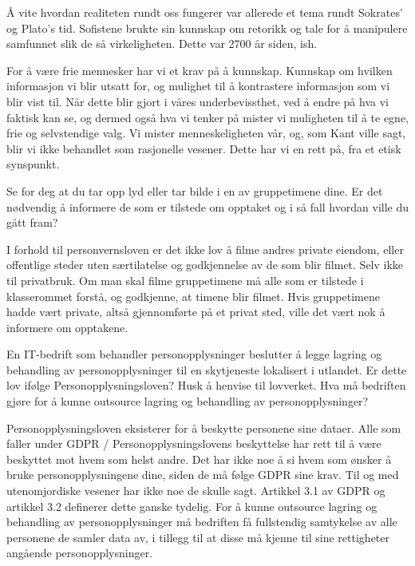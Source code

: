 \documentclass{../../myassignment}
\begin{document}
	\begin{answer}
		Å vite hvordan realiteten rundt oss fungerer var allerede et tema rundt Sokrates' og Plato's tid. Sofistene brukte sin kunnskap om retorikk og tale for å manipulere samfunnet slik de så virkeligheten. Dette var 2700 år siden, ish. 

		For å være frie mennesker har vi et krav på å kunnskap. Kunnskap om hvilken informasjon vi blir utsatt for, og mulighet til å kontrastere informasjon som vi blir vist til. Når dette blir gjort i våres underbevissthet, ved å endre på hva vi faktisk kan se, og dermed også hva vi tenker på mister vi muligheten til å te egne, frie og selvstendige valg. Vi mister menneskeligheten vår, og, som Kant ville sagt, blir vi ikke behandlet som rasjonelle vesener. Dette har vi en rett på, fra et etisk synspunkt.

	\end{answer}

	\begin{problem}
		Se for deg at du tar opp lyd eller tar bilde i en av gruppetimene dine. Er det nødvendig å informere de som er tilstede om opptaket og i så fall hvordan ville du gått fram?
	\end{problem}

	\begin{answer}
		I forhold til personvernsloven er det ikke lov å filme andres private eiendom, eller offentlige steder uten særtilatelse og godkjennelse av de som blir filmet. Selv ikke til privatbruk. Om man skal filme gruppetimene må alle som er tilstede i klasserommet forstå, og godkjenne, at timene blir filmet. Hvis gruppetimene hadde vært private, altså gjennomførte på et privat sted, ville det vært nok å informere om opptakene. 
	\end{answer}

	\begin{problem}
		En IT-bedrift som behandler personopplysninger beslutter å legge lagring og behandling av personopplysninger til en skytjeneste lokalisert i utlandet. Er dette lov ifølge Personopplysningsloven? Husk å henvise til lovverket. Hva må bedriften gjøre for å kunne outsource lagring og behandling av personopplysninger?
	\end{problem}

	\begin{answer}
		Personopplysningsloven eksisterer for å beskytte personene sine dataer. Alle som faller under GDPR / Personopplysningslovens beskyttelse har rett til å være beskyttet mot hvem som helst andre. Det har ikke noe å si hvem som ønsker å bruke personopplysningene dine, siden de må følge GDPR sine krav. Til og med utenomjordiske vesener har ikke noe de skulle sagt. Artikkel 3.1 av GDPR og artikkel 3.2 definerer dette ganske tydelig. For å kunne outsource lagring og behandling av personopplysninger må bedriften få fullstendig samtykelse av alle personene de samler data av, i tillegg til at disse må kjenne til sine rettigheter angående personopplysninger.
	\end{answer}
\end{document}
